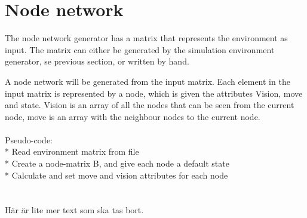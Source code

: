 \section{Node network}
The node network generator has a matrix that represents the environment as input. The matrix can either be generated by the simulation environment generator, se previous section, or written by hand.\\
\par{} A node network will be generated from the input matrix. Each element in the input matrix is represented by a node, which is given the attributes Vision, move and state. Vision is an array of all the nodes that can be seen from the current node, move is an array with the neighbour nodes to the current node.\\
\\
Pseudo-code:\\
* Read environment matrix from file\\
* Create a node-matrix B, and give each node a default state\\
* Calculate and set move and vision attributes for each node\\
\\
\\Här är lite mer text som ska tas bort.